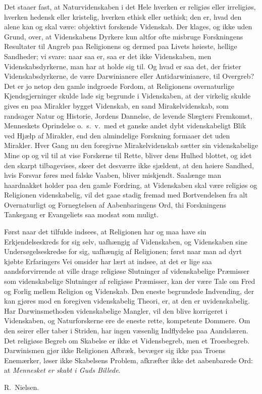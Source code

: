 \documentclass[12pt,a4paper]{article}
\newcommand{\apage}[1]{\marginnote{\footnotesize\textit{[#1]}}}
\begin{document}

Det staaer fast, at Naturvidenskaben i det Hele hverken er religiøs
eller irreligiøs, hverken hedensk eller \apage{458}kristelig, hverken ethisk eller
uethisk; den er, hvad den alene kan og skal være: objektivt forskende
Videnskab.
Der klages, og ikke uden Grund, over, at Videnskabens Dyrkere kun
altfor ofte misbruge Forskningens Resultater til Angreb paa Religionens
og dermed paa Livets høieste, hellige Sandheder; vi svare: naar saa
er, saa er det ikke Videnskaben, men Videnskabsdyrkerne, man har at
holde sig til.
Og hvad er saa det, der frister Videnskabsdyrkerne, de være
Darwinianere eller Antidarwinianere, til Overgreb? Det er jo netop den
gamle indgroede Fordom, at Religionens overnaturlige Kjendsgjerninger
skulde lade sig begrunde i Videnskaben, at der virkelig skulde gives en
paa Mirakler bygget Videnskab, en sand Mirakelvidenskab, som randsager
Natur og Historie, Jordens Dannelse, de levende Slægters Fremkomst,
Menneskets Oprindelse o.\ s.\ v.\ med et ganske andet dybt
videnskabeligt Blik ved Hjælp af Mirakler, end den almindelige
Forskning formaaer det uden Mirakler. Hver Gang nu den foregivne
Mirakelvidenskab sætter sin videnskabelige Mine op og vil til at vise
Forskerne til Rette, bliver dens Hulhed blottet, og idet den skarpt
tilbagevises, skeer det desværre ikke sjældent, at den høiere Sandhed,
hvis Forsvar føres med falske Vaaben, bliver miskjendt. Saalænge man
haardnakket holder paa den gamle Fordring, at Videnskaben skal være
religiøs og Religionen videnskabelig, vil det gaae stadig fremad med
Bortvendelsen fra alt Overnaturligt og Fornegtelsen af Aabenbaringens
Ord, thi Forskningens Tankegang er Evangeliets saa modsat som muligt.

Først naar det tilfulde indsees, at Religionen har og maa have sin
Erkjendelseskreds for sig selv, uafhængig af Videnskaben, og
Videnskaben sine Undersøgelseskredse for
\apage{459}sig, uafhængig af Religionen; først naar man ad dyrt kjøbte Erfaringers
Vei omsider har lært at indsee, at det er lige saa aandsforvirrende at
ville drage religiøse Slutninger af videnskabelige Præmisser som
videnskabelige Slutninger af religiøse Præmisser, kan der være Tale om
Fred og Forlig mellem Religion og Videnskab. Den eneste begrundede
Indvending, der kan gjøres mod en foregiven videnskabelig Theori, er,
at den er uvidenskabelig. Har Darwinsmethoden videnskabelige Mangler,
vil den blive korrigeret i Videnskaben, og Naturforskerne ere de eneste
rette, kompetente Dommere. Om den seirer eller taber i Striden, har
ingen væsenlig Indflydelse paa Aandslæren.
Det religiøse Begreb om Skabelse er ikke et Vidensbegreb, men et
Troesbegreb. Darwinismen gjør ikke Religionen Afbræk, bevæger sig ikke
paa Troens Enemærker, løser ikke Skabelsens Problem, afkræfter ikke
det aabenbarede Ord: at \emph{Mennesket er skabt i Guds Billede}.

\medskip
\begin{flushright}
R.\ Nielsen.
\end{flushright}
\end{document}
